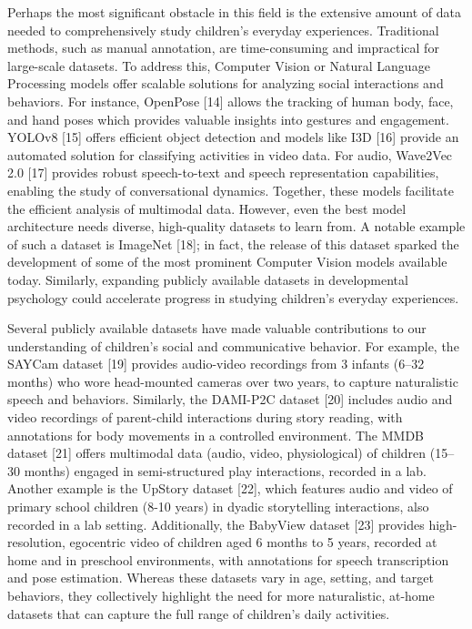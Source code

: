 \documentclass[
  man,floatsintext]{apa6}
\begin{document}
Perhaps the most significant obstacle in this field is the extensive amount of data needed to comprehensively study children's everyday experiences. Traditional methods, such as manual annotation, are time-consuming and impractical for large-scale datasets. To address this, Computer Vision or Natural Language Processing models offer scalable solutions for analyzing social interactions and behaviors. For instance, OpenPose {[}14{]} allows the tracking of human body, face, and hand poses which provides valuable insights into gestures and engagement. YOLOv8 {[}15{]} offers efficient object detection and models like I3D {[}16{]} provide an automated solution for classifying activities in video data. For audio, Wave2Vec 2.0 {[}17{]} provides robust speech-to-text and speech representation capabilities, enabling the study of conversational dynamics. Together, these models facilitate the efficient analysis of multimodal data. However, even the best model architecture needs diverse, high-quality datasets to learn from. A notable example of such a dataset is ImageNet {[}18{]}; in fact, the release of this dataset sparked the development of some of the most prominent Computer Vision models available today. Similarly, expanding publicly available datasets in developmental psychology could accelerate progress in studying children's everyday experiences.

Several publicly available datasets have made valuable contributions to our understanding of children's social and communicative behavior. For example, the SAYCam dataset {[}19{]} provides audio-video recordings from 3 infants (6--32 months) who wore head-mounted cameras over two years, to capture naturalistic speech and behaviors. Similarly, the DAMI-P2C dataset {[}20{]} includes audio and video recordings of parent-child interactions during story reading, with annotations for body movements in a controlled environment. The MMDB dataset {[}21{]} offers multimodal data (audio, video, physiological) of children (15--30 months) engaged in semi-structured play interactions, recorded in a lab. Another example is the UpStory dataset {[}22{]}, which features audio and video of primary school children (8-10 years) in dyadic storytelling interactions, also recorded in a lab setting. Additionally, the BabyView dataset {[}23{]} provides high-resolution, egocentric video of children aged 6 months to 5 years, recorded at home and in preschool environments, with annotations for speech transcription and pose estimation. Whereas these datasets vary in age, setting, and target behaviors, they collectively highlight the need for more naturalistic, at-home datasets that can capture the full range of children's daily activities.
\end{document}

